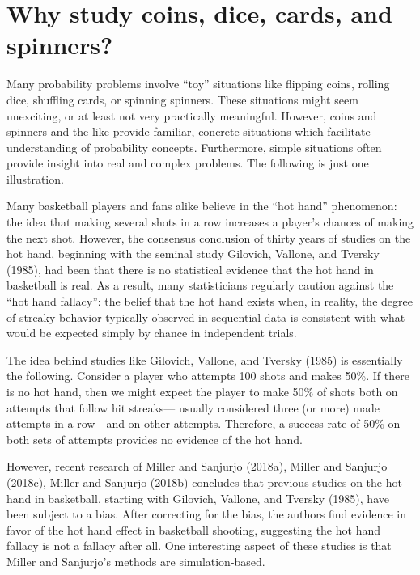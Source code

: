 \documentclass[
  letterpaper,
  DIV=11,
  numbers=noendperiod]{scrreprt}
\theoremstyle{plain}
\theoremstyle{definition}
\theoremstyle{definition}
\theoremstyle{definition}
\theoremstyle{remark}
\begin{document}
\section{Why study coins, dice, cards, and
spinners?}\label{sec-why-toys}

Many probability problems involve ``toy'' situations like flipping
coins, rolling dice, shuffling cards, or spinning spinners. These
situations might seem unexciting, or at least not very practically
meaningful. However, coins and spinners and the like provide familiar,
concrete situations which facilitate understanding of probability
concepts. Furthermore, simple situations often provide insight into real
and complex problems. The following is just one illustration.

Many basketball players and fans alike believe in the ``hot hand''
phenomenon: the idea that making several shots in a row increases a
player's chances of making the next shot. However, the consensus
conclusion of thirty years of studies on the hot hand, beginning with
the seminal study Gilovich, Vallone, and Tversky (1985), had been that
there is no statistical evidence that the hot hand in basketball is
real. As a result, many statisticians regularly caution against the
``hot hand fallacy'': the belief that the hot hand exists when, in
reality, the degree of streaky behavior typically observed in sequential
data is consistent with what would be expected simply by chance in
independent trials.

The idea behind studies like Gilovich, Vallone, and Tversky (1985) is
essentially the following. Consider a player who attempts 100 shots and
makes 50\%. If there is no hot hand, then we might expect the player to
make 50\% of shots both on attempts that follow hit streaks--- usually
considered three (or more) made attempts in a row---and on other
attempts. Therefore, a success rate of 50\% on both sets of attempts
provides no evidence of the hot hand.

However, recent research of Miller and Sanjurjo (2018a), Miller and
Sanjurjo (2018c), Miller and Sanjurjo (2018b) concludes that previous
studies on the hot hand in basketball, starting with Gilovich, Vallone,
and Tversky (1985), have been subject to a bias. After correcting for
the bias, the authors find evidence in favor of the hot hand effect in
basketball shooting, suggesting the hot hand fallacy is not a fallacy
after all. One interesting aspect of these studies is that Miller and
Sanjurjo's methods are simulation-based.
\end{document}
